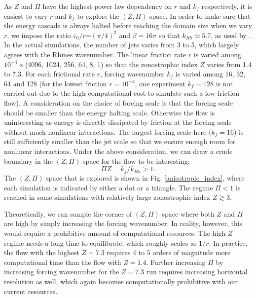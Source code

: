 \documentclass{jfm}
\begin{document}
As $Z$ and $\Pi$ have the highest power law dependency on $r$ and
$k_{f}$ respectively, it is easiest to vary $r$ and $k_{f}$ to
explore the $(Z,\Pi)$ space. In order to make sure that the energy cascade is
always halted before reaching the domain size when we vary $r$, we impose
the ratio $\varepsilon_{0}/r$=$(\pi/4)^{2}$ and $\beta=16\pi$ so
that $k_{Rh}\simeq5.7$, as used by \citet{Scott2012}. In
the actual simulations, the number of jets varies from 3 to 5, which
largely agrees with the Rhines wavenumber. The linear friction rate
$r$ is varied among $10^{-4}\times$(4096, 1024, 256, 64, 8, 1) so
that the zonostrophic index $Z$ varies from 1.4 to 7.3. For each frictional
rate $r$, forcing wavenumber $k_{f}$ is varied among 16, 32, 64
and 128 (for the lowest friction $r=10^{-4}$, one experiment $k_{f}=128$
is not carried out due to the high computational cost to simulate
such a low-friction flow). A consideration
on the choice of forcing scale is that the forcing scale should be
smaller than the energy halting scale. Otherwise the flow is
uninteresting as energy is directly dissipated by friction at the
forcing scale without much nonlinear interactions.
The largest forcing scale here ($k_{f}=16$) is
still sufficiently smaller than the jet scale so that we ensure
enough room for nonlinear interactions. Under the above consideration,
we can draw a crude boundary in the $(Z,\Pi)$ space
for the flow to be interesting:
\begin{equation}
\Pi Z=k_{f}/k_{Rh}>1.\label{eq:PIxZ>1}
\end{equation}
The $(Z,\Pi)$ space that is explored is shown in Fig. \ref{anisotropic_index},
where each simulation is indicated by either a dot or a triangle. The
regime $\Pi<1$ is reached in some simulations with relatively large
zonostrophic index $Z\apprge3$. 

Theoretically, we can sample the corner of $(Z,\Pi)$ space where
both $Z$ and $\Pi$ are high by simply increasing the forcing wavenumber.
In reality, however, this would require a prohibitive amount of computational
resources. The high $Z$ regime needs a long time to equilibrate, which roughly scales as $1/r$. 
In practice, the flow with the highest $Z=7.3$ requires 4 to 5 orders of magnitude
more computational time than the flow with $Z=1.4$. Further increasing $\Pi$ by increasing
forcing wavenumber for the $Z=7.3$ run requires increasing horizontal
resolution as well, which again becomes computationally prohibitive with
our current resources.
\end{document}
